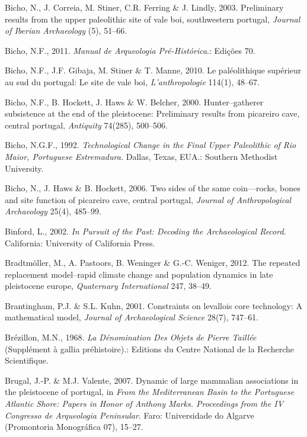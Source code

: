 \documentclass[12pt,twoside]{reedthesis}
\begin{document}
\leavevmode\hypertarget{ref-bicho2003}{}%
Bicho, N., J. Correia, M. Stiner, C.R. Ferring \& J. Lindly, 2003. Preliminary results from the upper paleolithic site of vale boi, southwestern portugal, \emph{Journal of Iberian Archaeology} (5), 51--66.

\leavevmode\hypertarget{ref-bicho2011}{}%
Bicho, N.F., 2011. \emph{Manual de Arqueologia Pré-Histórica}.: Edições 70.

\leavevmode\hypertarget{ref-bichoetal2010}{}%
Bicho, N.F., J.F. Gibaja, M. Stiner \& T. Manne, 2010. Le paléolithique supérieur au sud du portugal: Le site de vale boi, \emph{L'anthropologie} 114(1), 48--67.

\leavevmode\hypertarget{ref-bichoetal2000}{}%
Bicho, N.F., B. Hockett, J. Haws \& W. Belcher, 2000. Hunter--gatherer subsistence at the end of the pleistocene: Preliminary results from picareiro cave, central portugal, \emph{Antiquity} 74(285), 500--506.

\leavevmode\hypertarget{ref-bicho1992}{}%
Bicho, N.G.F., 1992. \emph{Technological Change in the Final Upper Paleolithic of Rio Maior, Portuguese Estremadura.} Dallas, Texas, EUA.: Southern Methodist University.

\leavevmode\hypertarget{ref-bicho2006}{}%
Bicho, N., J. Haws \& B. Hockett, 2006. Two sides of the same coin---rocks, bones and site function of picareiro cave, central portugal, \emph{Journal of Anthropological Archaeology} 25(4), 485--99.

\leavevmode\hypertarget{ref-binford2002}{}%
Binford, L., 2002. \emph{In Pursuit of the Past: Decoding the Archaeological Record}. California: University of California Press.

\leavevmode\hypertarget{ref-bradtmoller2012}{}%
Bradtmöller, M., A. Pastoors, B. Weninger \& G.-C. Weniger, 2012. The repeated replacement model--rapid climate change and population dynamics in late pleistocene europe, \emph{Quaternary International} 247, 38--49.

\leavevmode\hypertarget{ref-brantingham2001}{}%
Brantingham, P.J. \& S.L. Kuhn, 2001. Constraints on levallois core technology: A mathematical model, \emph{Journal of Archaeological Science} 28(7), 747--61.

\leavevmode\hypertarget{ref-brezillon1968}{}%
Brézillon, M.N., 1968. \emph{La Dénomination Des Objets de Pierre Taillée} (Supplément à gallia préhistoire).: Editions du Centre National de la Recherche Scientifique.

\leavevmode\hypertarget{ref-brugal2007}{}%
Brugal, J.-P. \& M.J. Valente, 2007. Dynamic of large mammalian associations in the pleistocene of portugal, in \emph{From the Mediterranean Basin to the Portuguese Atlantic Shore: Papers in Honor of Anthony Marks. Proceedings from the IV Congresso de Arqueologia Peninsular}. Faro: Universidade do Algarve (Promontoria Monográfica 07), 15--27.
\end{document}
